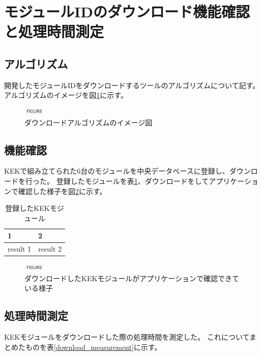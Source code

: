\section{モジュールIDのダウンロード機能確認と処理時間測定}
\subsection{アルゴリズム}
開発したモジュールIDをダウンロードするツールのアルゴリズムについて記す。
アルゴリズムのイメージを図\ref{download_algorithm}に示す。

\begin{figure}[bpt]\centering
\includegraphics[width=1cm]{figure}
\caption[ダウンロードアルゴリズムのイメージ図]{ダウンロードアルゴリズムのイメージ図}
\label{download_algorithm}
\end{figure}

\subsection{機能確認}
KEKで組み立てられた6台のモジュールを中央データベースに登録し、ダウンロードを行った。
登録したモジュールを表\ref{registered_kek_module}、ダウンロードをしてアプリケーションで確認した様子を図\ref{registered_kek_module_viewer}に示す。

\begin{table}[tbp]
\begin{center}
\caption[登録したKEKモジュール]{登録したKEKモジュール}
\label{registered_kek_module}
  \begin{tabular}{|ll|} \hline
    1 & 2 \\ \hline
    result 1 & result 2 \\ \hline 
  \end{tabular}
\end{center}
\end{table}

\begin{figure}[bpt]\centering
\includegraphics[width=1cm]{figure}
\caption[ダウンロードしたKEKモジュールがアプリケーションで確認できている様子]{ダウンロードしたKEKモジュールがアプリケーションで確認できている様子}
\label{registered_kek_module_viewer}
\end{figure}

\subsection{処理時間測定}
KEKモジュールをダウンロードした際の処理時間を測定した。
これについてまとめたものを表\ref{download_measurement}に示す。

